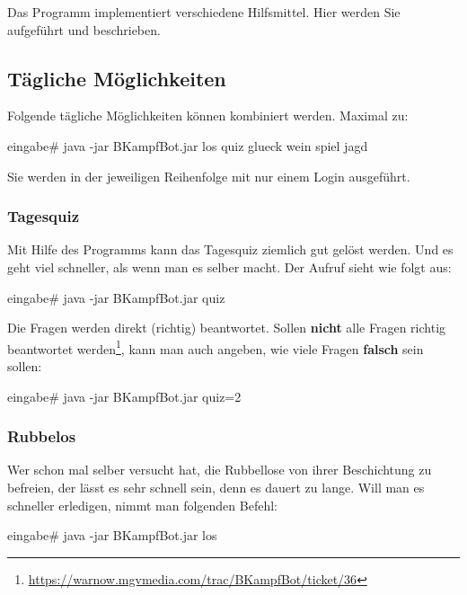 \documentclass{scrartcl}
\begin{document}
Das Programm implementiert verschiedene Hilfsmittel. Hier werden Sie aufgeführt und beschrieben.

\subsection{Tägliche Möglichkeiten}

Folgende tägliche Möglichkeiten können kombiniert werden. Maximal zu:

\begin{code}[emph={los,quiz,glueck,wein,spiel,jagd}]
eingabe# java -jar BKampfBot.jar los quiz glueck wein spiel jagd
\end{code}

Sie werden in der jeweiligen Reihenfolge mit nur einem Login ausgeführt.

\subsubsection{Tagesquiz}

Mit Hilfe des Programms kann das Tagesquiz ziemlich gut gelöst werden. Und es geht viel schneller, als wenn man es selber macht. Der Aufruf sieht wie folgt aus:

\begin{code}[emph={quiz}]
eingabe# java -jar BKampfBot.jar quiz
\end{code}

Die Fragen werden direkt (richtig) beantwortet. Sollen \textbf{nicht} alle Fragen richtig beantwortet werden\footnote{\url{https://warnow.mgvmedia.com/trac/BKampfBot/ticket/36}}, kann man auch angeben, wie viele Fragen \textbf{falsch} sein sollen:

\begin{code}[emph={quiz}]
eingabe# java -jar BKampfBot.jar quiz=2
\end{code}

\subsubsection{Rubbelos}

Wer schon mal selber versucht hat, die Rubbellose von ihrer Beschichtung zu befreien, der lässt es sehr schnell sein, denn es dauert zu lange. Will man es schneller erledigen, nimmt man folgenden Befehl:

\begin{code}[emph={los}]
eingabe# java -jar BKampfBot.jar los
\end{code}
\end{document}
